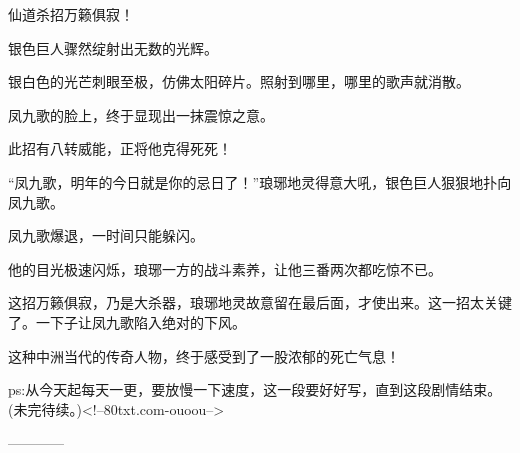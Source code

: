 \begin{this_body}
仙道杀招万籁俱寂！

银色巨人骤然绽射出无数的光辉。

银白色的光芒刺眼至极，仿佛太阳碎片。照射到哪里，哪里的歌声就消散。

凤九歌的脸上，终于显现出一抹震惊之意。

此招有八转威能，正将他克得死死！

“凤九歌，明年的今日就是你的忌日了！”琅琊地灵得意大吼，银色巨人狠狠地扑向凤九歌。

凤九歌爆退，一时间只能躲闪。

他的目光极速闪烁，琅琊一方的战斗素养，让他三番两次都吃惊不已。

这招万籁俱寂，乃是大杀器，琅琊地灵故意留在最后面，才使出来。这一招太关键了。一下子让凤九歌陷入绝对的下风。

这种中洲当代的传奇人物，终于感受到了一股浓郁的死亡气息！

ps:从今天起每天一更，要放慢一下速度，这一段要好好写，直到这段剧情结束。(未完待续。)<!--80txt.com-ouoou-->

------------

\end{this_body}

